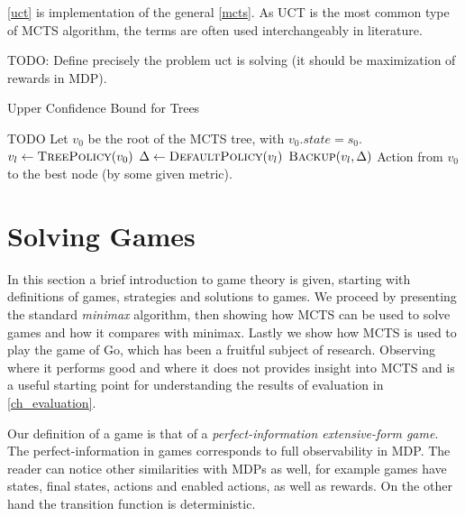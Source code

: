 \autoref{uct} is implementation of the general \autoref{mcts}. As UCT is
the most common type of MCTS algorithm, the terms are often used
interchangeably in literature.

TODO: Define precisely the problem uct is solving (it should be
maximization of rewards in MDP).

\begin{algorithm}
    \caption{Upper Confidence Bound for Trees}
\label{uct}
\begin{algorithmic}
    \State TODO
    \State Let $v_0$ be the root of the MCTS tree, with $v_0.state = s_0$.
        \State $v_l \gets \Call{TreePolicy}{v_0}$
        \State $\Delta \gets \Call{DefaultPolicy}{v_l}$
        \State $\Call{Backup}{v_l, \Delta}$
    \EndWhile
    \State \Return Action from $v_0$ to the best node (by some
    given metric).
\EndFunction
\end{algorithmic}
\end{algorithm}

\section{Solving Games}

In this section a brief introduction to game theory is given, starting
with definitions of games, strategies and solutions to games. We
proceed by presenting the standard {\em minimax} algorithm, then showing
how MCTS can be used to solve games and how it compares with minimax.
Lastly we show how MCTS is used to play the game of Go, which has been a
fruitful subject of research.
Observing where it performs good and where it does not provides insight
into MCTS and is a useful starting point for understanding the results
of evaluation in \autoref{ch_evaluation}.


Our definition of a game is that of a {\em perfect-information
extensive-form game}. The perfect-information in games corresponds to
full observability in MDP.  The reader can notice other similarities
with MDPs as well, for example games have states, final states, actions
and enabled actions, as well as rewards. On the other hand the
transition function is deterministic.

